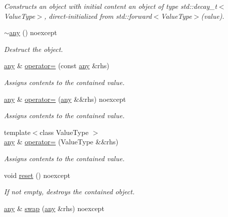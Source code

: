 \begin{DoxyCompactItemize}
\begin{DoxyCompactList}\small\item\em Constructs an object with initial content an object of type std\+::decay\+\_\+t$<$\+Value\+Type$>$, direct-\/initialized from std\+::forward$<$\+Value\+Type$>$(value). \end{DoxyCompactList}\item 
\mbox{\hyperlink{classbfl_1_1any_1_1any_a14390d38352d52e2a447dc62d0b19941}{$\sim$any}} () noexcept
\begin{DoxyCompactList}\small\item\em Destruct the object. \end{DoxyCompactList}\item 
\mbox{\hyperlink{classbfl_1_1any_1_1any}{any}} \& \mbox{\hyperlink{classbfl_1_1any_1_1any_a067d769bffdf2782e8d1dc080f66d948}{operator=}} (const \mbox{\hyperlink{classbfl_1_1any_1_1any}{any}} \&rhs)
\begin{DoxyCompactList}\small\item\em Assigns contents to the contained value. \end{DoxyCompactList}\item 
\mbox{\hyperlink{classbfl_1_1any_1_1any}{any}} \& \mbox{\hyperlink{classbfl_1_1any_1_1any_a65609849a81b0af40e6b86751ae0350c}{operator=}} (\mbox{\hyperlink{classbfl_1_1any_1_1any}{any}} \&\&rhs) noexcept
\begin{DoxyCompactList}\small\item\em Assigns contents to the contained value. \end{DoxyCompactList}\item 
{\footnotesize template$<$class Value\+Type $>$ }\\\mbox{\hyperlink{classbfl_1_1any_1_1any}{any}} \& \mbox{\hyperlink{classbfl_1_1any_1_1any_a62a6777ca18bd10bf05ffa0f6d131435}{operator=}} (Value\+Type \&\&rhs)
\begin{DoxyCompactList}\small\item\em Assigns contents to the contained value. \end{DoxyCompactList}\item 
void \mbox{\hyperlink{classbfl_1_1any_1_1any_ae4e063fb12711ea99a78bdab4d5c3e36}{reset}} () noexcept
\begin{DoxyCompactList}\small\item\em If not empty, destroys the contained object. \end{DoxyCompactList}\item 
\mbox{\hyperlink{classbfl_1_1any_1_1any}{any}} \& \mbox{\hyperlink{classbfl_1_1any_1_1any_a0441e5816aa5ef4721f134868b7ca402}{swap}} (\mbox{\hyperlink{classbfl_1_1any_1_1any}{any}} \&rhs) noexcept

\end{DoxyCompactItemize}
